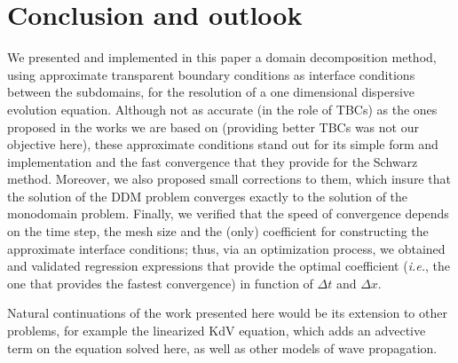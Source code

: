 \section{Conclusion and outlook}

\indent We presented and implemented in this paper a domain decomposition method, using approximate transparent boundary conditions as interface  conditions between the subdomains, for the resolution of a one dimensional dispersive evolution equation. Although not as accurate (in the role of TBCs) as the ones proposed in the works we are based on (providing better TBCs was not our objective here), these approximate conditions stand out for its simple form and implementation and the fast convergence that they provide for the Schwarz method. Moreover, we also proposed small corrections to them, which insure that the solution of the DDM problem converges exactly to the solution of the monodomain problem. Finally, we verified that the speed of convergence depends on the time step, the mesh size and the (only) coefficient for constructing the approximate interface conditions; thus, via an optimization process, we obtained and validated regression expressions that provide the optimal coefficient (\emph{i.e.}, the one that provides the fastest convergence) in function of $\Delta t $ and $\Delta x$.

\indent Natural continuations of the work presented here would be its extension to other problems, for example the linearized KdV equation, which adds an advective term on the equation solved here, as well as other models of wave propagation.